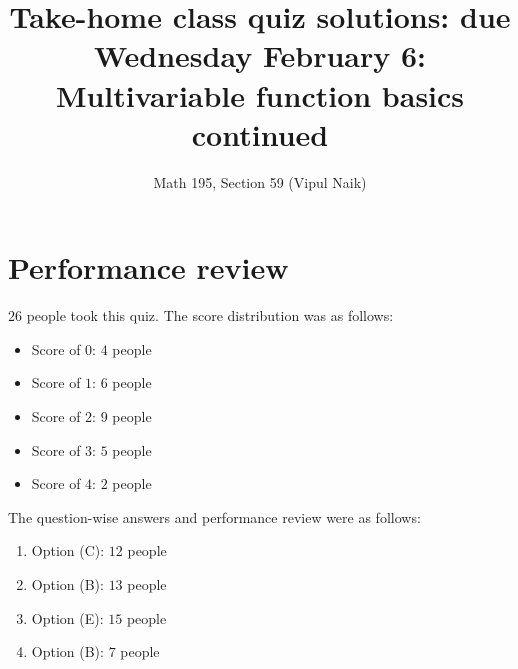 \documentclass[10pt]{amsart}
\title{Take-home class quiz solutions: due Wednesday February 6: Multivariable function basics continued}
\author{Math 195, Section 59 (Vipul Naik)}
\begin{document}
\maketitle

\section{Performance review}

$26$ people took this quiz. The score distribution was as follows:

\begin{itemize}
\item Score of $0$: $4$ people
\item Score of $1$: $6$ people
\item Score of $2$: $9$ people
\item Score of $3$: $5$ people
\item Score of $4$: $2$ people
\end{itemize}

The question-wise answers and performance review were as follows:

\begin{enumerate}
\item Option (C): $12$ people 
\item Option (B): $13$ people
\item Option (E): $15$ people
\item Option (B): $7$ people
\end{enumerate}
\end{document}
